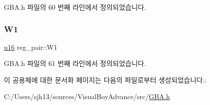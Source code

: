 G\+B\+A.\+h 파일의 60 번째 라인에서 정의되었습니다.

\mbox{\label{unionreg__pair_a37144044fd8cda6dccc874086212be44}} 
\subsubsection{\texorpdfstring{W1}{W1}}
{\footnotesize\ttfamily \mbox{\hyperlink{_system_8h_a9e6c91d77e24643b888dbd1a1a590054}{u16}} reg\+\_\+pair\+::\+W1}



G\+B\+A.\+h 파일의 61 번째 라인에서 정의되었습니다.



이 공용체에 대한 문서화 페이지는 다음의 파일로부터 생성되었습니다.\+:\begin{DoxyCompactItemize}
\item 
C\+:/\+Users/sjh13/sources/\+Visual\+Boy\+Advance/src/\mbox{\hyperlink{_g_b_a_8h}{G\+B\+A.\+h}}\end{DoxyCompactItemize}
